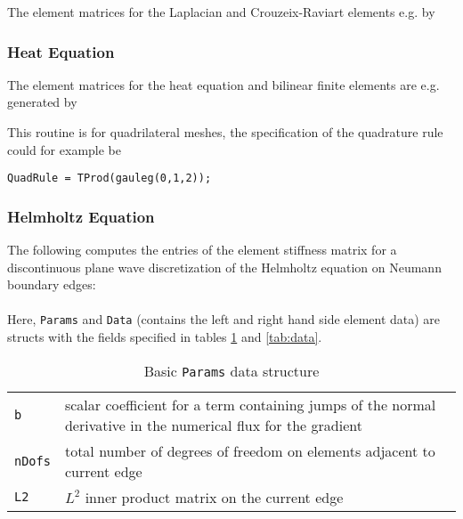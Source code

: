  The element matrices for the Laplacian and Crouzeix-Raviart elements e.g. by \\



\subsubsection{Heat Equation} 

The element matrices for the heat equation and bilinear finite elements are e.g. generated by \\
 

This routine is for quadrilateral meshes, the specification of the quadrature rule could for example be

\verb!QuadRule = TProd(gauleg(0,1,2));!


\subsubsection{Helmholtz Equation} 

 The following computes the entries of the element stiffness matrix for a discontinuous plane wave discretization of the Helmholtz equation on Neumann boundary edges: \\

 \\

 Here, {\tt Params} and {\tt Data} (contains the left and right hand side element data) are structs with the fields specified in tables \ref{tab:params} and \ref{tab:data}.

\begin{table}[htb]
  \begin{tabular}{p{1cm}p{10cm}}
    {\tt b} & {\small scalar coefficient for a term containing jumps of the normal derivative in the numerical flux for the gradient} \\
    {\tt nDofs} & {\small total number of degrees of freedom on elements adjacent to current edge} \\
    {\tt L2} & {\small $L^2$ inner product matrix on the current edge}
  \end{tabular}
  \caption{Basic {\tt Params} data structure}
  \label{tab:params}
\end{table}

